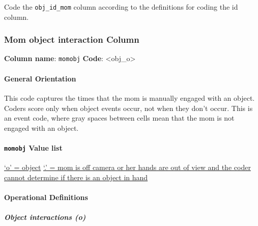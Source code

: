 \documentclass[
  12pt,
]{book}
\begin{document}
Code the \texttt{obj\_id\_mom} column according to the definitions for coding the id column.

\hypertarget{mom-object-interaction-column}{%
\subsubsection*{Mom object interaction Column}\label{mom-object-interaction-column}}

\textbf{Column name}: \texttt{momobj}
\textbf{Code}: \textless obj\_o\textgreater{}

\hypertarget{general-orientation-2}{%
\paragraph*{General Orientation}\label{general-orientation-2}}

This code captures the times that the mom is manually engaged with an object. Coders score only when object events occur, not when they don't occur. This is an event code, where gray spaces between cells mean that the mom is not engaged with an object.

\hypertarget{momobj-value-list}{%
\paragraph*{\texorpdfstring{\texttt{momobj} Value list}{momobj Value list}}\label{momobj-value-list}}

\protect\hyperlink{mom_obj}{`o' = object}
\protect\hyperlink{mom_hands_off_camera}{`.' = mom is off camera or her hands are out of view and the coder cannot determine if there is an object in hand}

\hypertarget{operational-definitions}{%
\paragraph*{Operational Definitions}\label{operational-definitions}}

\hypertarget{mom_obj}{%
\subparagraph*{Object interactions (o)}\label{mom_obj}}
\end{document}
